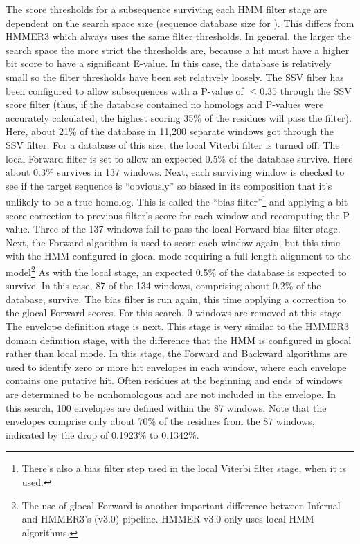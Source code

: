 The score thresholds for a subsequence surviving each HMM filter stage
are dependent on the search space size (sequence database size for
). This differs from HMMER3 which always uses the same
filter thresholds. In general, the larger the search
space the more strict the thresholds are, because a hit must have a
higher bit score to have a significant E-value.  In this case, the
database is relatively small so the filter thresholds have been set
relatively loosely. The SSV filter has been configured to allow
subsequences with a P-value of $\leq 0.35$ through
the SSV score filter (thus, if the database contained no homologs and
P-values were accurately calculated, the highest scoring 35\% of the
residues will pass the filter). Here, about 21\% of the database in
11,200 separate windows got through the SSV filter. For a database of
this size, the local Viterbi filter is turned off.  The local Forward filter
is set to allow an expected 0.5\% of the database survive. Here about
0.3\% survives in 137 windows. Next, each surviving window is checked
to see if the target sequence is ``obviously'' so biased in its
composition that it's unlikely to be a true homolog. This is called
the ``bias filter''\footnote{There's also a bias filter step used in
  the local Viterbi filter stage, when it is used.} and applying a bit
score correction to previous filter's score for each window and
recomputing the P-value. Three of the 137 windows fail to pass
the local Forward bias filter stage. Next, the Forward algorithm is
used to score each window again, but this time with the HMM configured
in glocal mode requiring a full length alignment to the
model\footnote{The use of glocal Forward is another important
  difference between Infernal and HMMER3's (v3.0) pipeline. HMMER v3.0
  only uses local HMM algorithms.}  As with the local stage, an
expected 0.5\% of the database is expected to survive. In this case,
87 of the 134 windows, comprising about 0.2\% of the database,
survive. The bias filter is run again, this time applying a correction
to the glocal Forward scores. For this search, 0 windows are removed at
this stage. The envelope definition stage is next. This stage is very
similar to the HMMER3 domain definition stage, with the difference
that the HMM is configured in glocal rather than local mode. In this
stage, the Forward and Backward algorithms are used to identify zero
or more hit envelopes in each window, where each envelope contains one
putative hit.  Often residues at the beginning and ends of windows are
determined to be nonhomologous and are not included in the
envelope. In this search, 100 envelopes are defined within the 87
windows. Note that the envelopes comprise only about 70\% of the
residues from the 87 windows, indicated by the drop of 0.1923\% to
0.1342\%.

